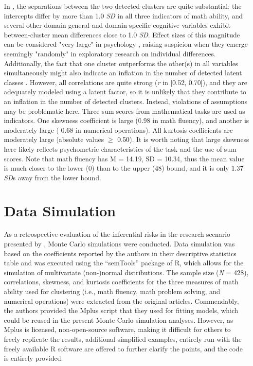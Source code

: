 \documentclass[letterpaper,11pt]{article}
\begin{document}
In , the separations between the two detected clusters are quite substantial: the intercepts differ by more than 1.0 \textit{SD} in all three indicators of math ability, and several other domain-general and domain-specific cognitive variables exhibit between-cluster mean differences close to 1.0 \textit{SD}. Effect sizes of this magnitude can be considered "very large" in psychology , raising suspicion when they emerge seemingly "randomly" in exploratory research on individual differences. Additionally, the fact that one cluster outperforms the other(s) in all variables simultaneously might also indicate an inflation in the number of detected latent classes \cite{toffalini2022entia}. However, all correlations are quite strong (\textit{r} in [0.52, 0.70]), and they are adequately modeled using a latent factor, so it is unlikely that they contribute to an inflation in the number of detected clusters. Instead, violations of assumptions may be problematic here. Three sum scores from mathematical tasks are used as indicators. One skewness coefficient is large (0.98 in math fluency), and another is moderately large (-0.68 in numerical operations). All kurtosis coefficients are moderately large (absolute values $\geq$ 0.50). It is worth noting that large skewness here likely reflects psychometric characteristics of the task and the use of sum scores. Note that math fluency has M = 14.19, SD = 10.34, thus the mean value is much closer to the lower (0) than to the upper (48) bound, and it is only 1.37 \textit{SD}s away from the lower bound.

\section*{Data Simulation}

As a retrospective evaluation of the inferential risks in the research scenario presented by , Monte Carlo simulations were conducted. Data simulation was based on the coefficients reported by the authors in their descriptive statistics table and was executed using the “semTools” package of R, which allows for the simulation of multivariate (non-)normal distributions. The sample size (\textit{N} = 428), correlations, skewness, and kurtosis coefficients for the three measures of math ability used for clustering (i.e., math fluency, math problem solving, and numerical operations) were extracted from the original articles. Commendably, the authors provided the Mplus script that they used for fitting models, which could be reused in the present Monte Carlo simulation analyses. However, as Mplus is licensed, non-open-source software, making it difficult for others to freely replicate the results, additional simplified examples, entirely run with the freely available R software \cite{team2010r} are offered to further clarify the points, and the code is entirely provided.
\end{document}
